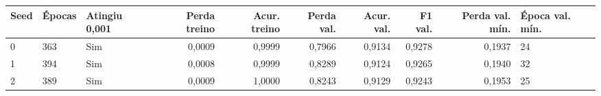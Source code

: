 \begin{tabular}{lllrrrrrrl}
\toprule
Seed & Épocas & Atingiu 0,001 & Perda treino & Acur. treino & Perda val. & Acur. val. & F1 val. & Perda val. mín. & Época val. mín. \\
\midrule
0 & 363 & Sim & 0,0009 & 0,9999 & 0,7966 & 0,9134 & 0,9278 & 0,1937 & 24 \\
1 & 394 & Sim & 0,0008 & 0,9999 & 0,8289 & 0,9124 & 0,9265 & 0,1940 & 32 \\
2 & 389 & Sim & 0,0009 & 1,0000 & 0,8243 & 0,9129 & 0,9243 & 0,1953 & 25 \\
\bottomrule
\end{tabular}
